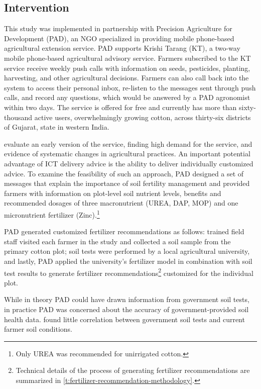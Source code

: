 \documentclass{article}
\begin{document}
\subsection{Intervention}

This study was implemented in partnership with Precision Agriculture for Development (PAD), an NGO specialized in providing mobile phone-based agricultural extension service. PAD supports Krishi Tarang (KT), a two-way mobile phone-based agricultural advisory service. Farmers subscribed to the KT service receive weekly push calls with information on seeds,  pesticides, planting, harvesting, and other agricultural decisions. Farmers can also call back into the system to access their personal inbox, re-listen to the messages sent through push calls, and record any questions, which would be answered by a PAD agronomist within two days. The service is offered for free and currently has more than sixty-thousand active users, overwhelmingly growing cotton, across thirty-six districts of Gujarat, state in western India. 

\citet{Cole2020MobileizingSustainability} evaluate an early version of the service, finding high demand for the service, and evidence of systematic changes in agricultural practices. An important potential advantage of ICT delivery advice is the ability to deliver individually customized advice. To examine the feasibility of such an approach, PAD designed a set of messages that explain the importance of soil fertility management and provided farmers with information on plot-level soil nutrient levels, benefits and recommended dosages of three macronutrient (UREA, DAP, MOP) and one micronutrient fertilizer (Zinc).\footnote{Only UREA was recommended for unirrigated cotton.}

PAD generated customized fertilizer recommendations as follows: trained field staff visited each farmer in the study and collected a soil sample from the primary cotton plot; soil tests were performed by a local agricultural university, and lastly, PAD applied the university’s fertilizer model in combination with soil test results to generate fertilizer recommendations\footnote{Technical details of the process of generating fertilizer recommendations are summarized in \ref{t:fertilizer-recommendation-methodology}.} customized for the individual plot.

While in theory PAD could have drawn information from government soil tests, in practice PAD was concerned about the accuracy of government-provided soil health data. \citet{Cole2017TheAgriculture} found little correlation between government soil tests and current farmer soil conditions.
\end{document}
